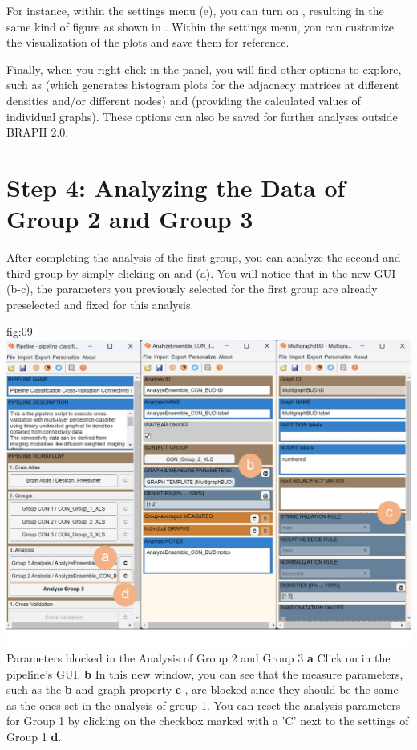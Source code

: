\documentclass[justified]{tufte-handout}
\begin{document}
{For instance, within the settings menu (e), you can turn on , resulting in the same kind of figure as shown in . Within the settings menu, you can customize the visualization of the plots and save them for reference.

Finally, when you right-click in the  panel, you will find other options to explore, such as  (which generates histogram plots for the adjacnecy matrices at different densities and/or different nodes) and  (providing the calculated values of individual graphs). These options can also be saved for further analyses outside BRAPH 2.0.

\section{Step 4: Analyzing the Data of Group 2 and Group 3}

After completing the analysis of the first group, you can analyze the second and third group by simply clicking on  and  (a). You will notice that in the new GUI (b-c), the parameters you previously selected for the first group are already preselected and fixed for this analysis. 


	{fig:09}
	{
	\includegraphics{fig09.jpg}
	}
	{Parameters blocked in the Analysis of Group 2 and Group 3}
	{
	{\bf a} Click on  in the pipeline's GUI.
	{\bf b} In this new window, you can see that the measure parameters, such as the {\bf b}  and graph property {\bf c} , are blocked since they should be the same as the ones set in the analysis of group 1. You can reset the analysis parameters for Group 1 by clicking on the checkbox marked with a 'C' next to the settings of Group 1 {\bf d}.
	}
	
}
\end{document}
